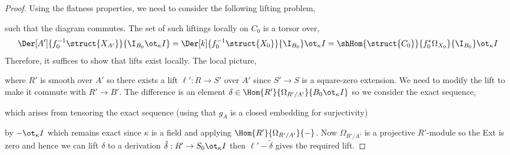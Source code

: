 \documentclass[12pt]{article}
\begin{document}
\begin{proof}
Using the flatness properties, we need to consider the following lifting problem,
\begin{center}
\end{center}
such that the diagram commutes. The set of such liftings locally on $C_0$ is a torsor over,
\[ \Der[A']{f_0^{-1} \struct{X_{A'}}}{\I_{B_0} \ot_\kappa I} = \Der[k]{f_0^{-1} \struct{X_0}}{\I_{B_0}} \ot_\kappa I = \shHom{\struct{C_0}}{f_0^* \Omega_{X_0}}{\I_{B_0}} \ot_\kappa I \]
Therefore, it suffices to show that lifts exist locally. The local picture,
\begin{center}
\end{center}
where $R'$ is smooth over $A'$ so there exists a lift $\ell' : R \to S'$ over $A'$ since $S' \to S$ is a square-zero extension. We need to modify the lift to make it commute with $R' \to B'$. The difference is an element $\delta \in \Hom{R'}{\Omega_{R'/A'}}{B_0 \ot_\kappa I}$  
so we consider the exact sequence,
\begin{center}
\end{center}
which arises from tensoring the exact sequence (using that $g_A$ is a closed embedding for surjectivity)
\begin{center}
\end{center}
by $- \ot_\kappa I$ which remains exact since $\kappa$ is a field and applying $\Hom{R'}{\Omega_{R'/A'}}{-}$. Now $\Omega_{R'/A'}$ is a projective $R'$-module so the Ext is zero and hence we can lift $\delta$ to a derivation $\tilde{\delta} : R' \to S_0 \ot_\kappa I$ then $\ell' - \tilde{\delta}$ gives the required lift. 
\end{proof}
\end{document}
